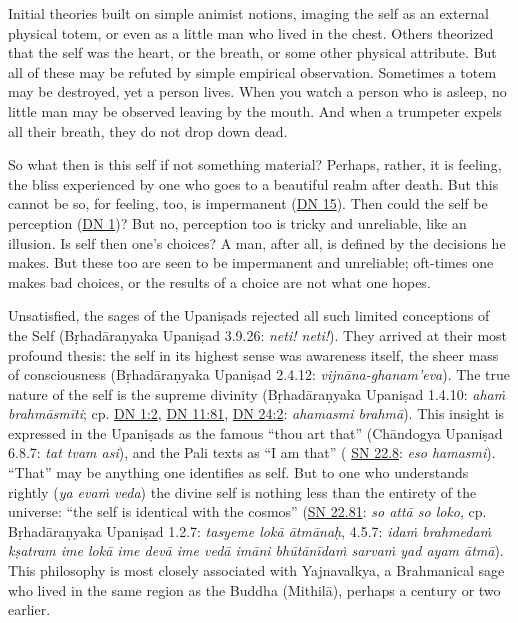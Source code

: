 \documentclass[12pt,openany]{book}%
\begin{document}
Initial theories built on simple animist notions, imaging the self as an external physical totem, or even as a little man who lived in the chest. Others theorized that the self was the heart, or the breath, or some other physical attribute. But all of these may be refuted by simple empirical observation. Sometimes a totem may be destroyed, yet a person lives. When you watch a person who is asleep, no little man may be observed leaving by the mouth. And when a trumpeter expels all their breath, they do not drop down dead.

So what then is this self if not something material? Perhaps, rather, it is feeling, the bliss experienced by one who goes to a beautiful realm after death. But this cannot be so, for feeling, too, is impermanent (\href{https://suttacentral.net/dn15}{DN 15}). Then could the self be perception (\href{https://suttacentral.net/dn1}{DN 1})? But no, perception too is tricky and unreliable, like an illusion. Is self then one’s choices? A man, after all, is defined by the decisions he makes. But these too are seen to be impermanent and unreliable; oft-times one makes bad choices, or the results of a choice are not what one hopes.

Unsatisfied, the sages of the \textsanskrit{Upaniṣads} rejected all such limited conceptions of the Self (\textsanskrit{Bṛhadāraṇyaka} \textsanskrit{Upaniṣad} 3.9.26: \textit{neti! neti!}). They arrived at their most profound thesis: the self in its highest sense was awareness itself, the sheer mass of consciousness (\textsanskrit{Bṛhadāraṇyaka} \textsanskrit{Upaniṣad} 2.4.12: \textit{\textsanskrit{vijnāna}-ghanam’eva}). The true nature of the self is the supreme divinity (\textsanskrit{Bṛhadāraṇyaka} \textsanskrit{Upaniṣad} 1.4.10: \textit{\textsanskrit{ahaṁ} \textsanskrit{brahmāsmīti}}; cp. \href{https://suttacentral.net/dn1/en/sujato\#2}{DN 1:2}, \href{https://suttacentral.net/dn11/en/sujato\#81}{DN 11:81}, \href{https://suttacentral.net/dn24/en/sujato\#2}{DN 24:2}: \textit{ahamasmi \textsanskrit{brahmā}}). This insight is expressed in the \textsanskrit{Upaniṣads} as the famous “thou art that” (\textsanskrit{Chāndogya} \textsanskrit{Upaniṣad} 6.8.7: \textit{tat tvam asi}), and the Pali texts as “I am that” ( \href{https://suttacentral.net/sn22.8}{SN 22.8}: \textit{eso hamasmi}). “That” may be anything one identifies as self. But to one who understands rightly (\textit{ya \textsanskrit{evaṁ} veda}) the divine self is nothing less than the entirety of the universe: “the self is identical with the cosmos” (\href{https://suttacentral.net/sn22.81}{SN 22.81}: \textit{so \textsanskrit{attā} so loko}, cp. \textsanskrit{Bṛhadāraṇyaka} \textsanskrit{Upaniṣad} 1.2.7: \textit{tasyeme \textsanskrit{lokā} \textsanskrit{ātmānaḥ}}, 4.5.7: \textit{\textsanskrit{idaṁ} \textsanskrit{brahmedaṁ} \textsanskrit{kṣatram} ime \textsanskrit{lokā} ime \textsanskrit{devā} ime \textsanskrit{vedā} \textsanskrit{imāni} \textsanskrit{bhūtānīdaṁ} \textsanskrit{sarvaṁ} yad ayam \textsanskrit{ātmā}}). This philosophy is most closely associated with Yajnavalkya, a Brahmanical sage who lived in the same region as the Buddha (\textsanskrit{Mithilā}), perhaps a century or two earlier.
\end{document}
